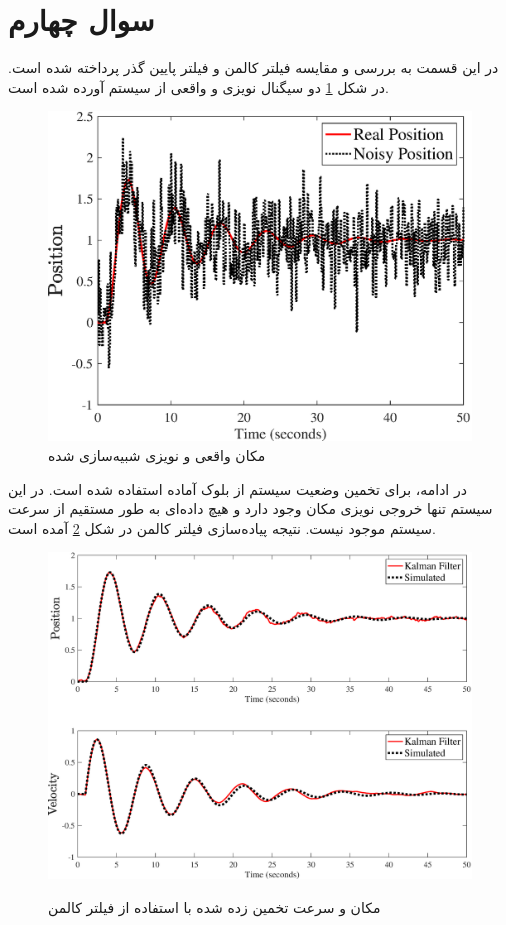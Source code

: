 \section{سوال چهارم}
در این قسمت به بررسی و مقایسه فیلتر کالمن
و فیلتر پایین گذر
پرداخته شده است.
در شکل
\ref{fig:real_vs_noisy}
دو سیگنال نویزی و واقعی از سیستم آورده شده است.
 \begin{figure}[H]
	\centering
	\includegraphics[width=\linewidth]{../Figure/Q4/real_vs_noisy}
	\caption{مکان واقعی و نویزی شبیه‌سازی شده}
	\label{fig:real_vs_noisy}
\end{figure}

در ادامه، برای تخمین وضعیت سیستم از بلوک آماده
استفاده شده است. در این سیستم تنها خروجی نویزی مکان وجود دارد و هیچ داده‌ای به طور مستقیم از سرعت سیستم موجود نیست.
نتیجه پیاده‌سازی فیلتر کالمن در شکل 
\ref{fig:kalman_filter}
آمده است.

 \begin{figure}[H]
	\centering
	\includegraphics[width=\linewidth]{../Figure/Q4/Kalman}
	\label{fig:kalman_filter}
	\caption{مکان و سرعت تخمین زده شده با استفاده از فیلتر کالمن}
\end{figure}

